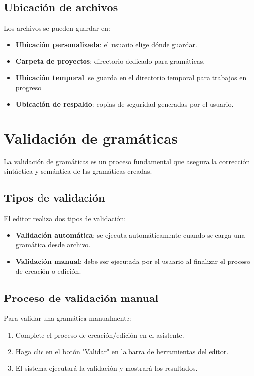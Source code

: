 \subsection{Ubicación de archivos}

Los archivos se pueden guardar en:

\begin{itemize}
    \item \textbf{Ubicación personalizada}: el usuario elige dónde guardar.
    \item \textbf{Carpeta de proyectos}: directorio dedicado para gramáticas.
    \item \textbf{Ubicación temporal}: se guarda en el directorio temporal para trabajos en progreso.
    \item \textbf{Ubicación de respaldo}: copias de seguridad generadas por el usuario.
\end{itemize}

\section{Validación de gramáticas}

La validación de gramáticas es un proceso fundamental que asegura la corrección sintáctica y semántica de las gramáticas creadas.

\subsection{Tipos de validación}

El editor realiza dos tipos de validación:

\begin{itemize}
    \item \textbf{Validación automática}: se ejecuta automáticamente cuando se carga una gramática desde archivo.
    \item \textbf{Validación manual}: debe ser ejecutada por el usuario al finalizar el proceso de creación o edición.
\end{itemize}

\subsection{Proceso de validación manual}

Para validar una gramática manualmente:

\begin{enumerate}
    \item Complete el proceso de creación/edición en el asistente.
    \item Haga clic en el botón \string"Validar\string" en la barra de herramientas del editor.
    \item El sistema ejecutará la validación y mostrará los resultados.
\end{enumerate}

